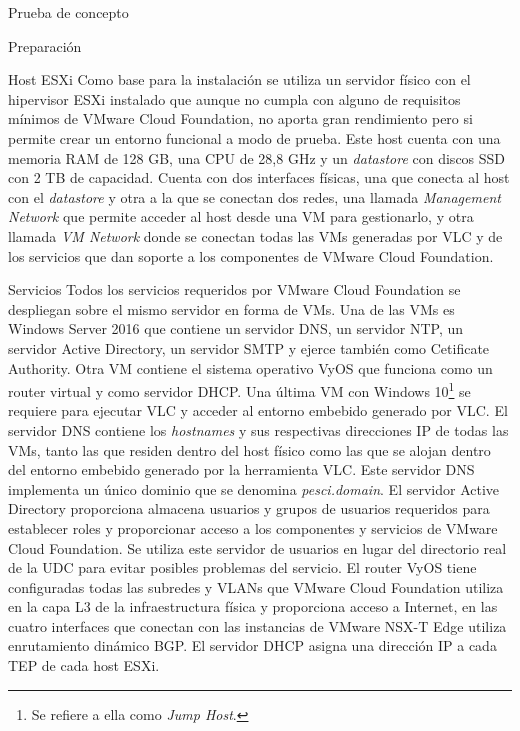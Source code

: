 \begin{section}{Prueba de concepto}
\begin{subsection}{Preparación}
\begin{subsubsection}{Host ESXi}
  Como base para la instalación se utiliza un servidor físico con el hipervisor ESXi instalado que aunque no cumpla con alguno de requisitos mínimos de VMware Cloud Foundation, no aporta gran rendimiento pero si permite crear un entorno funcional a modo de prueba. Este host cuenta con una memoria RAM de 128 GB, una CPU de 28,8 GHz y un \textit{datastore} con discos SSD con 2 TB de capacidad. Cuenta con dos interfaces físicas, una que conecta al host con el \textit{datastore} y otra a la que se conectan dos redes, una llamada \textit{Management Network} que permite acceder al host desde una VM para gestionarlo, y otra llamada \textit{VM Network} donde se conectan todas las VMs generadas por VLC y de los servicios que dan soporte a los componentes de VMware Cloud Foundation.
  \end{subsubsection}
  \begin{subsubsection}{Servicios}
    Todos los servicios requeridos por VMware Cloud Foundation se despliegan sobre el mismo servidor en forma de VMs. Una de las VMs es Windows Server 2016 que contiene un servidor DNS, un servidor NTP, un servidor Active Directory, un servidor SMTP y ejerce también como Cetificate Authority. Otra VM contiene el sistema operativo VyOS que funciona como un router virtual y como servidor DHCP. Una última VM con Windows 10\footnote{Se refiere a ella como \textit{Jump Host}.} se requiere para ejecutar VLC y acceder al entorno embebido generado por VLC.
    El servidor DNS contiene los \textit{hostnames} y sus respectivas direcciones IP de todas las VMs, tanto las que residen dentro del host físico como las que se alojan dentro del entorno embebido generado por la herramienta VLC. Este servidor DNS implementa un único dominio que se denomina \textit{pesci.domain}. El servidor Active Directory proporciona almacena usuarios y grupos de usuarios requeridos para establecer roles y proporcionar acceso a los componentes y servicios de VMware Cloud Foundation. Se utiliza este servidor de usuarios en lugar del directorio real de la UDC para evitar posibles problemas del servicio. El router VyOS tiene configuradas todas las subredes y VLANs que VMware Cloud Foundation utiliza en la capa L3 de la infraestructura física y proporciona acceso a Internet, en las cuatro interfaces que conectan con las instancias de VMware NSX-T Edge utiliza enrutamiento dinámico BGP. El servidor DHCP asigna una dirección IP a cada TEP de cada host ESXi.    
  \end{subsubsection}
  

\end{subsection}
\end{section}
